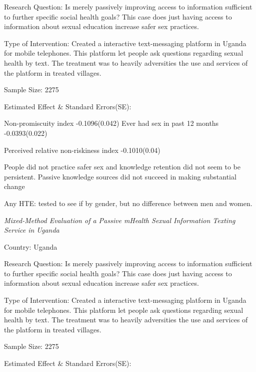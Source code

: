 \documentclass{article}
\begin{document}
\hfill

Research Question:
 Is merely passively improving access to  information sufficient to further specific social health goals? This case does just having access to information about sexual education increase safer sex practices.

\hfill

Type of Intervention: Created a  interactive text-messaging platform in Uganda for mobile telephones. This platform let people ask questions regarding sexual health by text. The treatment was to heavily adversities the use and services of the platform in treated villages.

\hfill

Sample Size: 2275
\hfill

Estimated Effect \& Standard Errors(SE): 

Non-promiscuity index -0.1096(0.042)
Ever had sex in past 12 months -0.0393(0.022)

Perceived relative non-riskiness index -0.1010(0.04)


\hfill
People did not practice safer sex and knowledge retention did not seem to be persistent. Passive knowledge sources did not succeed in making substantial change



\hfill

Any HTE: tested to see if by gender, but no difference between men and women.

\hfill

\textit{Mixed-Method Evaluation of a Passive mHealth Sexual Information Texting Service in Uganda
}


\hfill

Country: Uganda

\hfill

Research Question:
 Is merely passively improving access to  information sufficient to further specific social health goals? This case does just having access to information about sexual education increase safer sex practices.

\hfill

Type of Intervention: Created a  interactive text-messaging platform in Uganda for mobile telephones. This platform let people ask questions regarding sexual health by text. The treatment was to heavily adversities the use and services of the platform in treated villages.

\hfill

Sample Size: 2275
\hfill

Estimated Effect \& Standard Errors(SE): 
\end{document}
